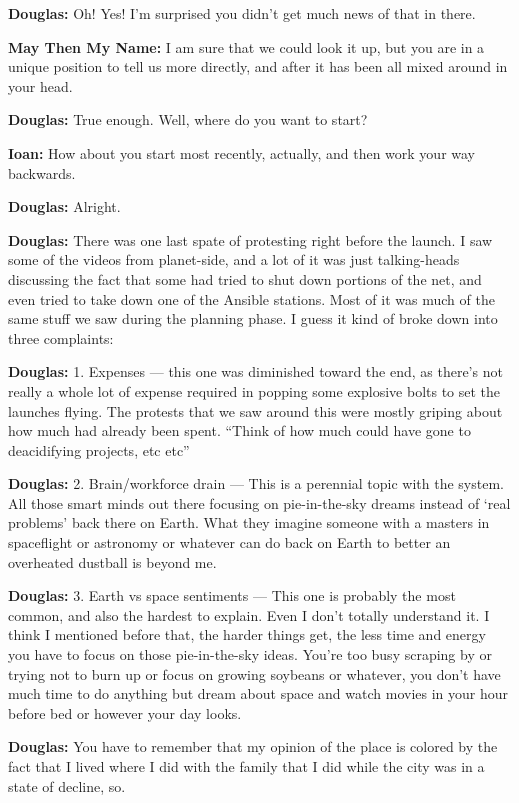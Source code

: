 \textbf{Douglas:} Oh! Yes! I'm surprised you didn't get much news of that in there.

\textbf{May Then My Name:} I am sure that we could look it up, but you are in a unique position to tell us more directly, and after it has been all mixed around in your head.

\textbf{Douglas:} True enough. Well, where do you want to start?

\textbf{Ioan:} How about you start most recently, actually, and then work your way backwards.

\textbf{Douglas:} Alright.

\textbf{Douglas:} There was one last spate of protesting right before the launch. I saw some of the videos from planet-side, and a lot of it was just talking-heads discussing the fact that some had tried to shut down portions of the net, and even tried to take down one of the Ansible stations. Most of it was much of the same stuff we saw during the planning phase. I guess it kind of broke down into three complaints:

\textbf{Douglas:} 1. Expenses — this one was diminished toward the end, as there's not really a whole lot of expense required in popping some explosive bolts to set the launches flying. The protests that we saw around this were mostly griping about how much had already been spent. ``Think of how much could have gone to deacidifying projects, etc etc''

\textbf{Douglas:} 2. Brain/workforce drain — This is a perennial topic with the system. All those smart minds out there focusing on pie-in-the-sky dreams instead of `real problems' back there on Earth. What they imagine someone with a masters in spaceflight or astronomy or whatever can do back on Earth to better an overheated dustball is beyond me.

\textbf{Douglas:} 3. Earth vs space sentiments — This one is probably the most common, and also the hardest to explain. Even I don't totally understand it. I think I mentioned before that, the harder things get, the less time and energy you have to focus on those pie-in-the-sky ideas. You're too busy scraping by or trying not to burn up or focus on growing soybeans or whatever, you don't have much time to do anything but dream about space and watch movies in your hour before bed or however your day looks.

\textbf{Douglas:} You have to remember that my opinion of the place is colored by the fact that I lived where I did with the family that I did while the city was in a state of decline, so.

